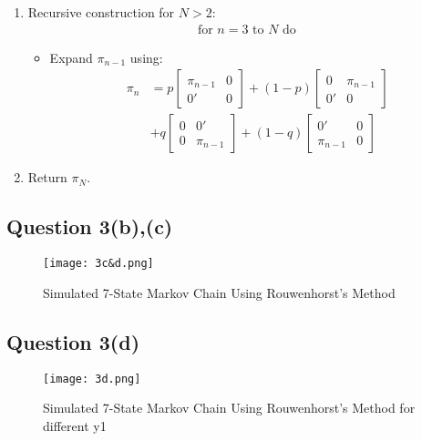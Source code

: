 \documentclass{article}
\begin{document}
\begin{enumerate}
    \item Recursive construction for $N > 2$:
    \begin{align*}
        \text{for } n = 3 \text{ to } N \text{ do}
    \end{align*}
    \begin{itemize}
        \item Expand $\pi_{n-1}$ using:
        \begin{align*}
            \pi_n &= p
            \begin{bmatrix}
                \pi_{n-1} & 0 \\
                0' & 0
            \end{bmatrix}
            + (1 - p)
            \begin{bmatrix}
                0 & \pi_{n-1} \\
                0' & 0
            \end{bmatrix} \\
            &+ q
            \begin{bmatrix}
                0 & 0' \\
                0 & \pi_{n-1}
            \end{bmatrix}
            + (1 - q)
            \begin{bmatrix}
                0' & 0 \\
                \pi_{n-1} & 0
            \end{bmatrix}
        \end{align*}
    \end{itemize}
    
    \item Return $\pi_N$.
\end{enumerate}

\subsection*{Question 3(b),(c)}
\begin{figure}[H]
    \centering
    \texttt{[image: 3c\&d.png]}
    \caption{Simulated 7-State Markov Chain Using Rouwenhorst's Method}
    \label{fig:3c&d}
\end{figure}

\subsection*{Question 3(d)}
\begin{figure}[H]
    \centering
    \texttt{[image: 3d.png]}
    \caption{Simulated 7-State Markov Chain Using Rouwenhorst's Method for different y1}
    \label{fig:3d}
\end{figure}
\end{document}
